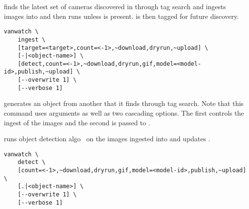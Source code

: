  finds the latest set of cameras discovered in  through tag search and ingests  images into  and then runs  unless  is present.  is then tagged for future discovery. 
%
\begin{verbatim}
vanwatch \
	ingest \
	[target=<target>,count=<-1>,~download,dryrun,~upload] \
	[-|<object-name>] \
	[detect,count=<-1>,~download,dryrun,gif,model=<model-id>,publish,~upload] \
	[--overwrite 1] \
	[--verbose 1]
\end{verbatim}
%
 generates an object from another that it finds through tag search. Note that this command uses arguments as well as two cascading options. The first controls the ingest of the images and the second is passed to .

 runs object detection algo~\cite{ultralytics} on the images ingested into  and updates .
%
\begin{verbatim}
vanwatch \
	detect \
	[count=<-1>,~download,dryrun,gif,model=<model-id>,publish,~upload] \
	[.|<object-name>] \
	[--overwrite 1] \
	[--verbose 1]
\end{verbatim}